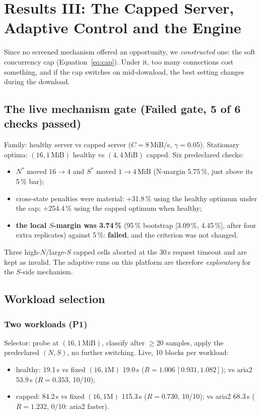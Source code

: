 \chapter{Results III: The Capped Server, Adaptive Control and the Engine}\label{ch:cap}
Since no screened mechanism offered an opportunity, we \emph{constructed} one: the soft concurrency cap (Equation~\ref{eq:cap}). Under it, too many connections cost something, and if the cap switches on mid-download, the best setting changes during the download.

\section{The live mechanism gate (Failed gate, 5 of 6 checks passed)}
Family: healthy server vs capped server ($C=8$\,MiB/s, $\gamma=0.05$). Stationary optima: $(16, 1\,\text{MiB})$ healthy vs $(4, 4\,\text{MiB})$ capped. Six predeclared checks:
\begin{itemize}
\item $N^*$ moved $16\to4$ and $S^*$ moved $1\to4$\,MiB (N-margin 5.75\,\%, just above its 5\,\% bar);
\item cross-state penalties were material: +31.8\,\% using the healthy optimum under the cap; +254.4\,\% using the capped optimum when healthy;
\item \textbf{the local $S$-margin was 3.74\,\%} (95\,\% bootstrap [3.09\,\%, 4.45\,\%], after four extra replicates) against 5\,\%: \textbf{failed}, and the criterion was not changed.
\end{itemize}
Three high-$N$/large-$S$ capped cells aborted at the 30\,s request timeout and are kept as invalid. The adaptive runs on this platform are therefore \emph{exploratory} for the $S$-side mechanism.

\section{Workload selection}
\subsection{Two workloads (P1)}
Selector: probe at $(16, 1\,\text{MiB})$, classify after $\ge20$ samples, apply the predeclared $(N,S)$, no further switching. Live, 10 blocks per workload:
\begin{itemize}
\item healthy: 19.1\,s vs fixed $(16,1\text{M})$ 19.0\,s ($R=1.006\,[0.931, 1.082]$); vs aria2 53.9\,s ($R=0.353$, 10/10);
\item capped: 84.2\,s vs fixed $(16,1\text{M})$ 115.3\,s ($R=0.730$, 10/10); vs aria2 68.3\,s ($R=1.232$, 0/10: aria2 faster).
\end{itemize}


